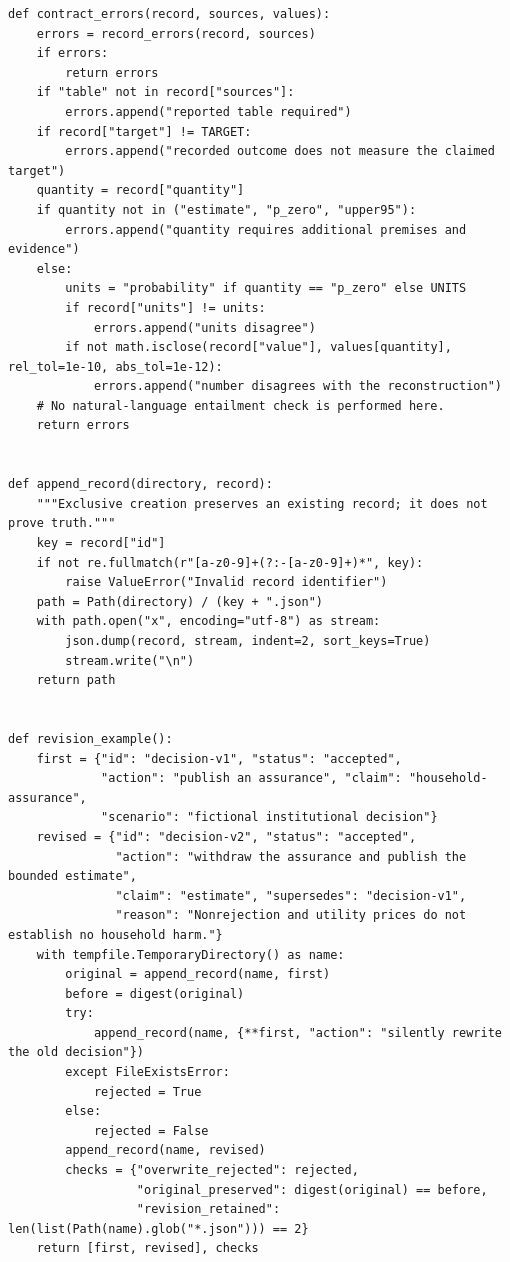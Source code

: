 \begin{Verbatim}[breaklines,breakanywhere,fontsize=\small]
def contract_errors(record, sources, values):
    errors = record_errors(record, sources)
    if errors:
        return errors
    if "table" not in record["sources"]:
        errors.append("reported table required")
    if record["target"] != TARGET:
        errors.append("recorded outcome does not measure the claimed target")
    quantity = record["quantity"]
    if quantity not in ("estimate", "p_zero", "upper95"):
        errors.append("quantity requires additional premises and evidence")
    else:
        units = "probability" if quantity == "p_zero" else UNITS
        if record["units"] != units:
            errors.append("units disagree")
        if not math.isclose(record["value"], values[quantity], rel_tol=1e-10, abs_tol=1e-12):
            errors.append("number disagrees with the reconstruction")
    # No natural-language entailment check is performed here.
    return errors


def append_record(directory, record):
    """Exclusive creation preserves an existing record; it does not prove truth."""
    key = record["id"]
    if not re.fullmatch(r"[a-z0-9]+(?:-[a-z0-9]+)*", key):
        raise ValueError("Invalid record identifier")
    path = Path(directory) / (key + ".json")
    with path.open("x", encoding="utf-8") as stream:
        json.dump(record, stream, indent=2, sort_keys=True)
        stream.write("\n")
    return path


def revision_example():
    first = {"id": "decision-v1", "status": "accepted",
             "action": "publish an assurance", "claim": "household-assurance",
             "scenario": "fictional institutional decision"}
    revised = {"id": "decision-v2", "status": "accepted",
               "action": "withdraw the assurance and publish the bounded estimate",
               "claim": "estimate", "supersedes": "decision-v1",
               "reason": "Nonrejection and utility prices do not establish no household harm."}
    with tempfile.TemporaryDirectory() as name:
        original = append_record(name, first)
        before = digest(original)
        try:
            append_record(name, {**first, "action": "silently rewrite the old decision"})
        except FileExistsError:
            rejected = True
        else:
            rejected = False
        append_record(name, revised)
        checks = {"overwrite_rejected": rejected,
                  "original_preserved": digest(original) == before,
                  "revision_retained": len(list(Path(name).glob("*.json"))) == 2}
    return [first, revised], checks



\end{Verbatim}
